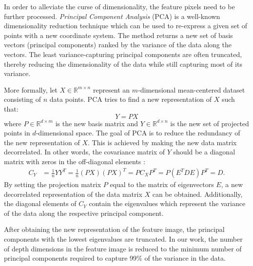 
In order to alleviate the curse of dimensionality, the feature pixels need to be further processed. \emph{Principal Component Analysis} (PCA) \parencite{wold1987principal} is a well-known dimensionality reduction technique which can be used to re-express a given set of points with a new coordinate system. The method returns a new set of basis vectors (principal components) ranked by the variance of the data along the vectors. The least variance-capturing principal components are often truncated, thereby reducing the dimensionality of the data while still capturing most of its variance.

More formally, let $X \in \mathbb{R}^{m \times n}$ represent an $m$-dimensional mean-centered dataset consisting of $n$ data points. PCA tries to find a new representation of $X$ such that:
\begin{equation}
    Y = PX
\end{equation}
where $P \in \mathbb{R}^{d \times m}$ is the new basis matrix and $Y \in \mathbb{R}^{d \times n}$ is the new set of projected points in $d$-dimensional space. The goal of PCA is to reduce the redundancy of the new representation of $X$. This is achieved by making the new data matrix decorrelated. In other words, the covariance matrix of $Y$ should be a diagonal matrix with zeros in the off-diagonal elements \parencite{shlens2014tutorial}:
\begin{align*}
    C_Y &= \frac{1}{n}YY^T
    = \frac{1}{n}(PX)(PX)^T
    = PC_XP^T
    = P(E^TDE)P^T
    = D.
\end{align*}
By setting the projection matrix $P$ equal to the matrix of eigenvectors $E$, a new decorrelated representation of the data matrix $X$ can be obtained. Additionally, the diagonal elements of $C_Y$ contain the eigenvalues which represent the variance of the data along the respective principal component.

After obtaining the new representation of the feature image, the principal components with the lowest eigenvalues are truncated. In our work, the number of depth dimensions in the feature image is reduced to the minimum number of principal components required to capture 99\% of the variance in the data.

